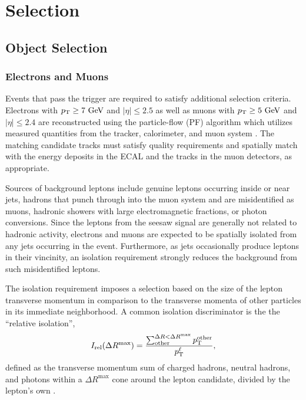 \chapter{Selection}
\label{chap:Selection}

\section{Object Selection}
\label{sec:Selection/Object}

\subsection{Electrons and Muons}
Events that pass the trigger are required to satisfy additional selection criteria. Electrons with $p_{\mathrm{T}} \geq 7\,\,\text{Ge\hspace{-.08em}V}$ and $|\eta| \leq 2.5$ as well as muons with $p_{\mathrm{T}} \geq 5\,\,\text{Ge\hspace{-.08em}V}$ and $|\eta| \leq 2.4$ are reconstructed using the particle-flow (PF) algorithm which utilizes measured quantities from the tracker, calorimeter, and muon system \cite{CMS-PAS-PFT-09-001}. The matching candidate tracks must satisfy quality requirements and spatially match with the energy deposits in the ECAL and the tracks in the muon detectors, as appropriate.

Sources of background leptons include genuine leptons occurring inside or near jets, hadrons that punch through into the muon system and are misidentified as muons, hadronic showers with large electromagnetic fractions, or photon conversions. Since the leptons from the seesaw signal are generally not related to hadronic activity, electrons and muons are expected to be spatially isolated from any jets occurring in the event. Furthermore, as jets occasionally produce leptons in their vincinity, an isolation requirement strongly reduces the background from such misidentified leptons.

The isolation requirement imposes a selection based on the size of the lepton transverse momentum in comparison to the transverse momenta of other particles in its immediate neighborhood. A common isolation discriminator is the the ``relative isolation'',
\begin{equation}
	I_\text{rel}(\Delta R^\textrm{max}) = \frac{\sum_\text{other}^{\Delta R < \Delta R^\textrm{max}} p_{\mathrm{T}}^\text{other}}{p_{\mathrm{T}}^\ell},
\end{equation}
defined as the transverse momentum sum of charged hadrons, neutral hadrons, and photons within a $\Delta R^\textrm{max}$ cone around the lepton candidate, divided by the lepton's own \pt.


